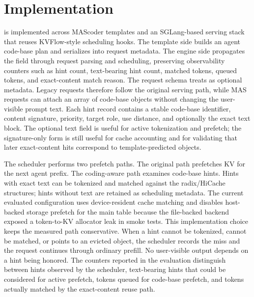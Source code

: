 \section{Implementation}

\system is implemented across MAScoder templates and an SGLang-based serving stack that reuses KVFlow-style scheduling hooks.
The template side builds an agent code-base plan and serializes \prefetchhint into request metadata.
The engine side propagates the field through request parsing and scheduling, preserving observability counters such as hint count, text-bearing hint count, matched tokens, queued tokens, and exact-content match reason.
The request schema treats \prefetchhint as optional metadata.
Legacy requests therefore follow the original serving path, while MAS requests can attach an array of code-base objects without changing the user-visible prompt text.
Each hint record contains a stable code-base identifier, content signature, priority, target role, use distance, and optionally the exact text block.
The optional text field is useful for active tokenization and prefetch; the signature-only form is still useful for cache accounting and for validating that later exact-content hits correspond to template-predicted objects.

The scheduler performs two prefetch paths.
The original path prefetches KV for the next agent prefix.
The coding-aware path examines code-base hints.
Hints with exact text can be tokenized and matched against the radix/HiCache structures; hints without text are retained as scheduling metadata.
The current evaluated configuration uses device-resident cache matching and disables host-backed storage prefetch for the main table because the file-backed backend exposed a token-to-KV allocator leak in smoke tests.
This implementation choice keeps the measured path conservative.
When a hint cannot be tokenized, cannot be matched, or points to an evicted object, the scheduler records the miss and the request continues through ordinary prefill.
No user-visible output depends on a hint being honored.
The counters reported in the evaluation distinguish between hints observed by the scheduler, text-bearing hints that could be considered for active prefetch, tokens queued for code-base prefetch, and tokens actually matched by the exact-content reuse path.

